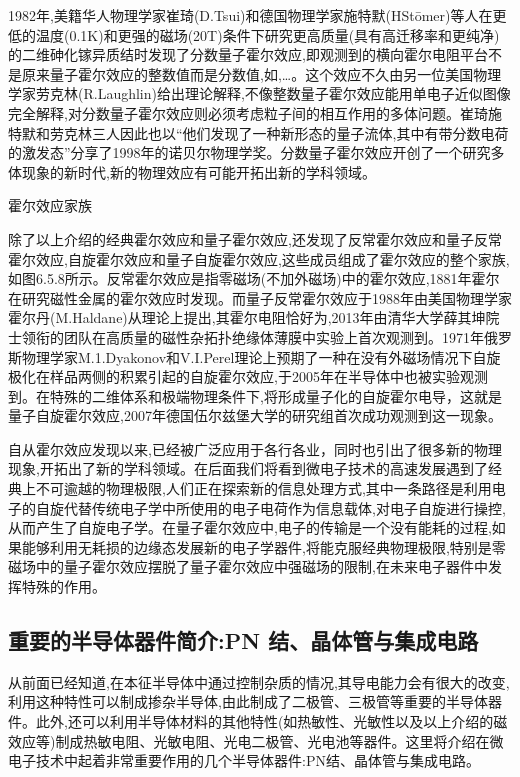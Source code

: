 1982年,美籍华人物理学家崔琦(D.Tsui)和德国物理学家施特默(HStōmer)等人在更低的温度(0.1K)和更强的磁场(20T)条件下研究更高质量(具有高迁移率和更纯净)的二维砷化镓异质结时发现了分数量子霍尔效应,即观测到的横向霍尔电阻平台不是原来量子霍尔效应的整数值而是分数值,如,…。这个效应不久由另一位美国物理学家劳克林(R.Laughlin)给出理论解释,不像整数量子霍尔效应能用单电子近似图像完全解释,对分数量子霍尔效应则必须考虑粒子间的相互作用的多体问题。崔琦施特默和劳克林三人因此也以“他们发现了一种新形态的量子流体,其中有带分数电荷的激发态”分享了1998年的诺贝尔物理学奖。分数量子霍尔效应开创了一个研究多体现象的新时代,新的物理效应有可能开拓出新的学科领域。

霍尔效应家族

除了以上介绍的经典霍尔效应和量子霍尔效应,还发现了反常霍尔效应和量子反常霍尔效应,自旋霍尔效应和量子自旋霍尔效应,这些成员组成了霍尔效应的整个家族,如图6.5.8所示。反常霍尔效应是指零磁场(不加外磁场)中的霍尔效应,1881年霍尔在研究磁性金属的霍尔效应时发现。而量子反常霍尔效应于1988年由美国物理学家霍尔丹(M.Haldane)从理论上提出,其霍尔电阻恰好为,2013年由清华大学薛其坤院士领衔的团队在高质量的磁性杂拓扑绝缘体薄膜中实验上首次观测到。1971年俄罗斯物理学家M.1.Dyakonov和V.I.Perel理论上预期了一种在没有外磁场情况下自旋极化在样品两侧的积累引起的自旋霍尔效应,于2005年在半导体中也被实验观测到。在特殊的二维体系和极端物理条件下,将形成量子化的自旋霍尔电导，这就是量子自旋霍尔效应,2007年德国伍尔兹堡大学的研究组首次成功观测到这一现象。

自从霍尔效应发现以来,已经被广泛应用于各行各业，同时也引出了很多新的物理现象,开拓出了新的学科领域。在后面我们将看到微电子技术的高速发展遇到了经典上不可逾越的物理极限,人们正在探索新的信息处理方式,其中一条路径是利用电子的自旋代替传统电子学中所使用的电子电荷作为信息载体,对电子自旋进行操控,从而产生了自旋电子学。在量子霍尔效应中,电子的传输是一个没有能耗的过程,如果能够利用无耗损的边缘态发展新的电子学器件,将能克服经典物理极限,特别是零磁场中的量子霍尔效应摆脱了量子霍尔效应中强磁场的限制,在未来电子器件中发挥特殊的作用。



\subsection{重要的半导体器件简介:PN 结、晶体管与集成电路}

从前面已经知道,在本征半导体中通过控制杂质的情况,其导电能力会有很大的改变,利用这种特性可以制成掺杂半导体,由此制成了二极管、三极管等重要的半导体器件。此外,还可以利用半导体材料的其他特性(如热敏性、光敏性以及以上介绍的磁效应等)制成热敏电阻、光敏电阻、光电二极管、光电池等器件。这里将介绍在微电子技术中起着非常重要作用的几个半导体器件:PN结、晶体管与集成电路。

